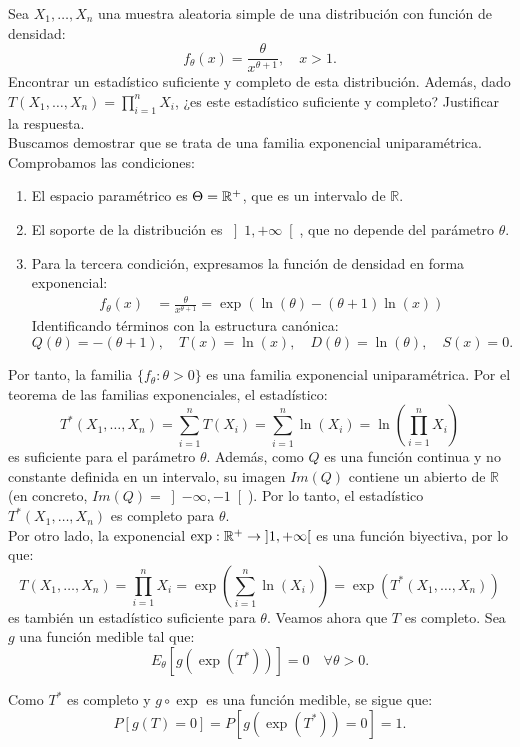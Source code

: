 \documentclass[12pt]{article}
\begin{document}
\begin{ejercicio}
    Sea $X_1, \dots, X_n$ una muestra aleatoria simple de una distribución con función de densidad:
    \[
        f_\theta(x) = \frac{\theta}{x^{\theta + 1}}, \quad x > 1.
    \]
    Encontrar un estadístico suficiente y completo de esta distribución. Además, dado $T(X_1, \dots, X_n) = \prod\limits_{i=1}^n X_i$, ¿es este estadístico suficiente y completo? Justificar la respuesta.\\

    Buscamos demostrar que se trata de una familia exponencial uniparamétrica. Comprobamos las condiciones:
    \begin{enumerate}
        \item El espacio paramétrico es $\Theta = \mathbb{R}^+$, que es un intervalo de $\mathbb{R}$.
        \item El soporte de la distribución es $\left]1, +\infty\right[$, que no depende del parámetro $\theta$.
        \item Para la tercera condición, expresamos la función de densidad en forma exponencial:
        \begin{align*}
            f_\theta(x) &= \frac{\theta}{x^{\theta + 1}} = \exp\left( \ln(\theta) - (\theta + 1)\ln(x) \right)
        \end{align*}
        Identificando términos con la estructura canónica:
        \[
        Q(\theta) = -(\theta + 1), \quad T(x) = \ln(x), \quad D(\theta) = \ln(\theta), \quad S(x) = 0.
        \]
    \end{enumerate}

    Por tanto, la familia $\{f_\theta : \theta > 0\}$ es una familia exponencial uniparamétrica. Por el teorema de las familias exponenciales, el estadístico:
    \[
        T^*(X_1, \ldots, X_n) = \sum_{i=1}^n T(X_i) = \sum_{i=1}^n \ln(X_i) = \ln\left( \prod_{i=1}^n X_i \right)
    \]
    es suficiente para el parámetro $\theta$. Además, como $Q$ es una función continua y no constante definida en un intervalo, su imagen $Im(Q)$ contiene un abierto de $\mathbb{R}$ (en concreto, $Im(Q)=\left]-\infty,-1\right[$). Por lo tanto, el estadístico $T^*(X_1, \ldots, X_n)$ es completo para $\theta$.\\

    Por otro lado, la exponencial $\exp:\mathbb{R}^+\to \left]1,+\infty\right[$ es una función biyectiva, por lo que:
    \[
        T(X_1, \ldots, X_n) = \prod_{i=1}^n X_i = \exp\left( \sum_{i=1}^n \ln(X_i) \right) = \exp(T^*(X_1, \ldots, X_n))
    \]
    es también un estadístico suficiente para $\theta$. Veamos ahora que $T$ es completo. Sea $g$ una función medible tal que:
    \[
        E_\theta[g(\exp(T^*))] = 0 \quad \forall \theta > 0.
    \]

    Como $T^*$ es completo y $g\circ \exp$ es una función medible, se sigue que:
    \[
        P[g(T) = 0] = P[g(\exp(T^*)) = 0] = 1.
    \]
\end{ejercicio}
\end{document}
